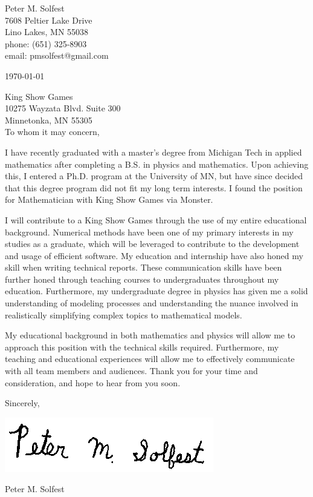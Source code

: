\documentclass[letterpaper,12pt]{article}
\begin{document}
Peter M. Solfest\\
7608 Peltier Lake Drive\\
Lino Lakes, MN 55038\\
phone: (651) 325-8903\\
email: pmsolfest@gmail.com

\today

King Show Games\\
10275 Wayzata Blvd. Suite 300\\
Minnetonka, MN 55305\\

To whom it may concern, %

I have recently graduated with a master's degree from Michigan Tech in applied mathematics after
completing a B.S. in physics and mathematics.
Upon achieving this, I entered a Ph.D. program at the University of MN, but have since
decided that this degree program did not fit my long term interests.
I found the position for Mathematician with King Show Games via Monster.

I will contribute to a King Show Games through the use of my entire educational background.
Numerical methods have been one of my primary interests in my studies as a graduate,
which will be leveraged to contribute to the development and usage of efficient software.
My education and internship have also honed my skill when writing technical reports.
These communication skills have been further honed through teaching courses to undergraduates
throughout my education.
Furthermore, my undergraduate degree in physics has given me a solid understanding of
modeling processes and understanding the nuance involved in realistically simplifying complex topics
to mathematical models.

My educational background in both mathematics and physics will allow 
me to approach this position with the technical skills required.
Furthermore, my teaching and educational experiences will allow me to 
effectively communicate with all team members and audiences.
Thank you for your time and consideration, and hope to hear from you soon.

Sincerely,

\includegraphics[height=.5in]{signature.png}

Peter M. Solfest
\end{document}
